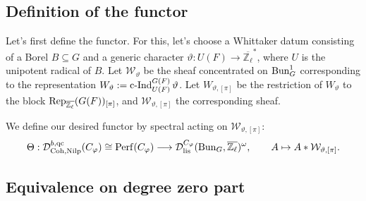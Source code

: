 %
%

\subsection{Definition of the functor}

Let's first define the functor. For this, let's choose a Whittaker datum consisting of a Borel $B \subseteq G$ and a generic character $\vartheta: U(F) \to \overline{\mathbb{Z}_{\ell}}^*$, where $U$ is the unipotent radical of $B$. Let $\mathcal{W}_{\vartheta}$ be the sheaf concentrated on $\operatorname{\operatorname{Bun}}_G^1$ corresponding to the representation $W_{\vartheta}:=\operatorname{\operatorname{c-Ind}}_{U(F)}^{G(F)}\vartheta$. Let $W_{\vartheta, [\pi]}$ be the restriction of $W_{\vartheta}$ to the block $\operatorname{\operatorname{Rep}}_{\overline{\mathbb{Z}_{\ell}}}(G(F))_{[\pi]}$, and $\mathcal{W}_{\vartheta, [\pi]}$ the corresponding sheaf.

We define our desired functor by spectral acting on $\mathcal{W}_{\vartheta, [\pi]}$:
$$\Theta: \mathcal{D}^{b, \operatorname{\operatorname{qc}}}_{\operatorname{\operatorname{Coh}}, \operatorname{\operatorname{Nilp}}}(C_{\varphi}) \cong \operatorname{\operatorname{Perf}}(C_{\varphi}) \longrightarrow \mathcal{D}_{\operatorname{\operatorname{lis}}}^{C_{\varphi}}(\operatorname{\operatorname{Bun}}_G, \overline{\mathbb{Z}_{\ell}})^{\omega}, \qquad A \mapsto A*\mathcal{W}_{\vartheta, [\pi]}.$$

\subsection{Equivalence on degree zero part}

